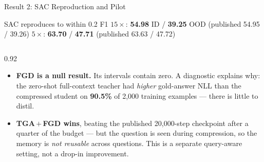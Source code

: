 \documentclass[usenames,dvipsnames,aspectratio=169,10pt]{beamer}
\begin{document}
\begin{frame}{Result 2: SAC Reproduction and Pilot}
\begin{block}{SAC reproduces to within 0.2 F1}
\footnotesize
$15\times$: \textbf{54.98} ID / \textbf{39.25} OOD (published 54.95 / 39.26)
\qquad
$5\times$: \textbf{63.70} / \textbf{47.71} (published 63.63 / 47.72)
\end{block}
\vspace{-0.1cm}
\centering
\scriptsize
\renewcommand{\arraystretch}{1.2}
\setlength{\tabcolsep}{4.5pt}



\vspace{0.3cm}
\begin{columns}
\begin{column}{0.92\textwidth}
\footnotesize
\begin{itemize}
  \item \textbf{FGD is a null result.} Its intervals contain zero. A diagnostic
        explains why: the zero-shot full-context teacher had \emph{higher}
        gold-answer NLL than the compressed student on \textbf{90.5\%} of
        2,000 training examples --- there is little to distil.
  \item \textbf{TGA\,$+$\,FGD wins}, beating the published 20,000-step
        checkpoint after a quarter of the budget --- but the question is seen
        during compression, so the memory is \emph{not reusable} across
        questions. This is a separate query-aware setting, not a drop-in
        improvement.
\end{itemize}
\end{column}
\end{columns}
\end{frame}
\end{document}
